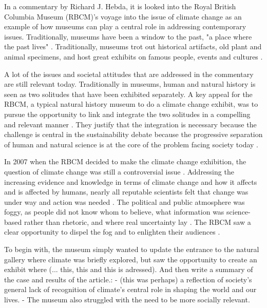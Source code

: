 In a commentary by Richard J. Hebda, it is looked into the Royal British Columbia Museum (RBCM)’s voyage into the issue of climate change as an example of how museums can play a central role in addressing contemporary issues. Traditionally, museums have been a window to the past, "a place where the past lives" \autocite[p. 1]{hebda_article}.  Traditionally, museums trot out historical artifacts, old plant and animal specimens, and host great exhibits on famous people, events and cultures \autocite[p.1]{hebda_article}.
\par
A lot of the issues and societal attitudes that are addressed in the commentary are still relevant today. Traditionally in museums, human and natural history is seen as two solitudes that have been exhibited separately. A key appeal for the RBCM, a typical natural history museum to do a climate change exhibit, was to pursue the opportunity to link and integrate the two solitudes in a compelling and relevant manner \autocite[p. 2]{hebda_article}. They justify that the integration is necessary because the challenge is central in the sustainability debate because the progressive separation of human and natural science is at the core of the problem facing society today \autocite[p.2]{hebda_article}.

In 2007 when the RBCM decided to make the climate change exhibition, the question of climate change was still a controversial issue \autocite[p.2]{hebda_article}. Addressing the increasing evidence and knowledge in terms of climate change and how it affects and is affected by humans, nearly all reputable scientists felt that change was under way and action was needed \autocite[p.2]{hebda_article}. The political and public atmosphere was foggy, as people did not know whom to believe, what information was science-based rather than rhetoric, and where real uncertainty lay \autocite[p.2]{hebda_article}. The RBCM saw a clear opportunity to dispel the fog and to enlighten their audiences \autocite[p.2]{hebda_article}.

To begin with, the museum simply wanted to update the entrance to the natural gallery where climate was briefly explored, but saw the opportunity to create an exhibit where (... this, this and this is adressed). And then write a summary of the case and results of the article.:
- (this was perhaps) a reflection of society’s general lack of recognition of climate’s central role in shaping the world and our lives.
- The museum also struggled with the need to be more socially relevant.


